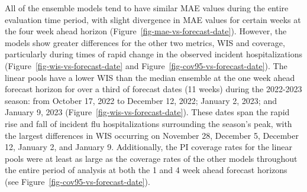 \documentclass[
  article,
  shortnames,
  notitle]{jss}
\begin{document}
All of the ensemble models tend to have similar MAE values during the
entire evaluation time period, with slight divergence in MAE values for
certain weeks at the four week ahead horizon
(Figure~\ref{fig-mae-vs-forecast-date}). However, the models show
greater differences for the other two metrics, WIS and coverage,
particularly during times of rapid change in the observed incident
hospitalizations (Figure~\ref{fig-wis-vs-forecast-date} and
Figure~\ref{fig-cov95-vs-forecast-date}). The linear pools have a lower
WIS than the median ensemble at the one week ahead forecast horizon for
over a third of forecast dates (11 weeks) during the 2022-2023 season:
from October 17, 2022 to December 12, 2022; January 2, 2023; and January
9, 2023 (Figure~\ref{fig-wis-vs-forecast-date}). These dates span the
rapid rise and fall of incident flu hospitalizations surrounding the
season's peak, with the largest differences in WIS occurring on November
28, December 5, December 12, January 2, and January 9. Additionally, the
PI coverage rates for the linear pools were at least as large as the
coverage rates of the other models throughout the entire period of
analysis at both the 1 and 4 week ahead forecast horizons (see
Figure~\ref{fig-cov95-vs-forecast-date}).
\end{document}
